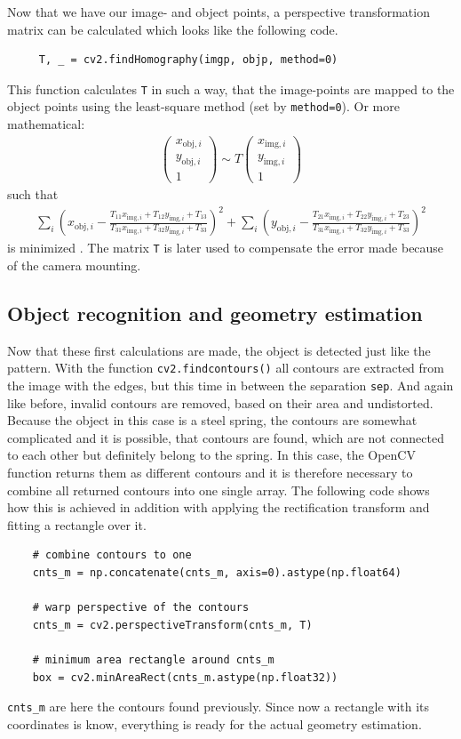 Now that we have our image- and object points, a perspective transformation matrix can be calculated which looks like the following code.
\begin{lstlisting}
	 T, _ = cv2.findHomography(imgp, objp, method=0)
\end{lstlisting}
This function calculates \texttt{T} in such a way, that the image-points are mapped to the object points using the least-square method (set by \texttt{method=0}).
Or more mathematical:
\begin{align*}
	\begin{pmatrix}
	x_{\text{obj}, i}\\
	y_{\text{obj}, i}\\
	1
	\end{pmatrix}\sim T
	\begin{pmatrix}
	x_{\text{img}, i}\\
	y_{\text{img}, i}\\
	1
	\end{pmatrix}	
\end{align*}
such that
\begin{align*}
	\sum_{i}\left(x_{\text{obj},i}-\frac{T_{11}x_{\text{img},i}+T_{12}y_{\text{img},i}+T_{13}}{T_{31}x_{\text{img},i}+T_{32}y_{\text{img},i}+T_{33}}\right)^2+
	\sum_{i}\left(y_{\text{obj},i}-\frac{T_{21}x_{\text{img},i}+T_{22}y_{\text{img},i}+T_{23}}{T_{31}x_{\text{img},i}+T_{32}y_{\text{img},i}+T_{33}}\right)^2
\end{align*}
is minimized \cite{cv_calib}.
The matrix \texttt{T} is later used to compensate the error made because of the camera mounting. 

\subsection{Object recognition and geometry estimation}
Now that these first calculations are made, the object is detected just like the pattern.
With the function \texttt{cv2.findcontours()} all contours are extracted from the image with the edges, but this time in between the separation \texttt{sep}.
And again like before, invalid contours are removed, based on their area and undistorted.
Because the object in this case is a steel spring, the contours are somewhat complicated and it is possible, that contours are found, which are not connected to each other but definitely belong to the spring.
In this case, the OpenCV function returns them as different contours and it is therefore necessary to combine all returned contours into one single array.
The following code shows how this is achieved in addition with applying the rectification transform and fitting a rectangle over it.
\begin{lstlisting}
	# combine contours to one
	cnts_m = np.concatenate(cnts_m, axis=0).astype(np.float64)
	
	# warp perspective of the contours
	cnts_m = cv2.perspectiveTransform(cnts_m, T)
	
	# minimum area rectangle around cnts_m
	box = cv2.minAreaRect(cnts_m.astype(np.float32))
\end{lstlisting}
\texttt{cnts\_m} are here the contours found previously.
Since now a rectangle with its coordinates is know, everything is ready for the actual geometry estimation.

